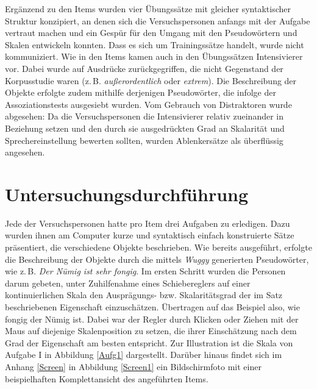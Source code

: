 Ergänzend zu den Items wurden vier Übungssätze mit gleicher syntaktischer Struktur konzipiert, an denen sich die Versuchspersonen anfangs mit der Aufgabe vertraut machen und ein Gespür für den Umgang mit den Pseudowörtern und Skalen entwickeln konnten. Dass es sich um Trainingssätze handelt, wurde nicht kommuniziert. Wie in den Items kamen auch in den Übungssätzen Intensivierer vor. Dabei wurde auf Ausdrücke zurückgegriffen, die nicht Gegenstand der Korpusstudie waren (z.\,B. \textit{außerordentlich} oder \textit{extrem}). Die Beschreibung der Objekte erfolgte zudem mithilfe derjenigen Pseudowörter, die infolge der Assoziationstests ausgesiebt wurden. Vom Gebrauch von Distraktoren wurde abgesehen: Da die Versuchspersonen die Intensivierer relativ zueinander in Beziehung setzen und den durch sie ausgedrückten Grad an Skalarität und Sprechereinstellung bewerten sollten, wurden Ablenkersätze als überflüssig angesehen.
%





\section{Untersuchungsdurchführung}\label{abs:Untersuchungsdurchführung155}
Jede der Versuchspersonen hatte pro Item drei Aufgaben zu erledigen. Dazu wurden ihnen am Computer kurze und syntaktisch einfach konstruierte Sätze präsentiert, die verschiedene Objekte beschrieben. Wie bereits ausgeführt, erfolgte die Beschreibung der Objekte durch die mittels \textit{Wuggy} generierten Pseudowörter, wie z.\,B. \textit{Der Nümig ist sehr fongig}. Im ersten Schritt wurden die Personen darum gebeten, unter Zuhilfenahme eines Schiebereglers auf einer kontinuierlichen Skala den Ausprägungs- bzw. Skalaritätsgrad der im Satz beschriebenen Eigenschaft einzuschätzen. Übertragen auf das Beispiel also, wie fongig der Nümig ist. Dabei war der Regler durch Klicken oder Ziehen mit der Maus auf diejenige Skalenposition zu setzen, die ihrer Einschätzung nach dem Grad der Eigenschaft am besten entspricht. Zur Illustration ist die Skala von {Aufgabe I} in Abbildung \ref{Aufg1} dargestellt. Darüber hinaus findet sich im {Anhang \ref{Screen}} in {Abbildung \ref{Screen1}} ein Bildschirmfoto mit einer beispielhaften Komplettansicht des angeführten Items.



